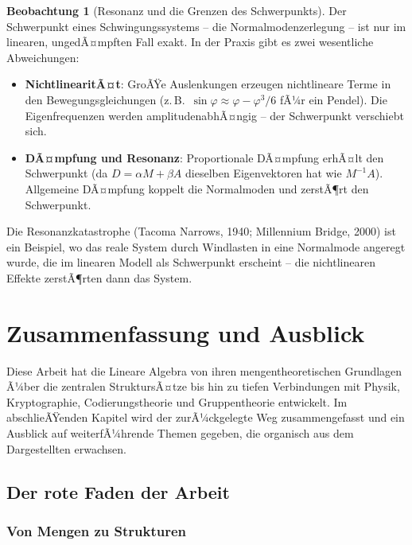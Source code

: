 ﻿\documentclass[a4paper,12pt]{report}
\theoremstyle{definition}
\newtheorem{beobachtung}{Beobachtung}
\begin{document}
\begin{beobachtung}[Resonanz und die Grenzen des Schwerpunkts]
    Der Schwerpunkt eines Schwingungssystems -- die Normalmodenzerlegung --
    ist nur im linearen, ungedÃ¤mpften Fall exakt. In der Praxis gibt es
    zwei wesentliche Abweichungen:
    \begin{itemize}
        \item[-] \textbf{NichtlinearitÃ¤t}: GroÃŸe Auslenkungen erzeugen
              nichtlineare Terme in den Bewegungsgleichungen
              (z.\,B.\ $\sin\varphi \approx \varphi - \varphi^3/6$
              fÃ¼r ein Pendel). Die Eigenfrequenzen werden
              amplitudenabhÃ¤ngig -- der Schwerpunkt verschiebt sich.
        \item[-] \textbf{DÃ¤mpfung und Resonanz}: Proportionale DÃ¤mpfung
              erhÃ¤lt den Schwerpunkt (da $D = \alpha M + \beta A$
              dieselben Eigenvektoren hat wie $M^{-1}A$). Allgemeine
              DÃ¤mpfung koppelt die Normalmoden und zerstÃ¶rt den Schwerpunkt.
    \end{itemize}
    Die Resonanzkatastrophe (Tacoma Narrows, 1940; Millennium Bridge, 2000)
    ist ein Beispiel, wo das reale System durch Windlasten in eine
    Normalmode angeregt wurde, die im linearen Modell als Schwerpunkt
    erscheint -- die nichtlinearen Effekte zerstÃ¶rten dann das System.
\end{beobachtung}

\chapter{Zusammenfassung und Ausblick}

Diese Arbeit hat die Lineare Algebra von ihren mengentheoretischen
Grundlagen Ã¼ber die zentralen StruktursÃ¤tze bis hin zu tiefen
Verbindungen mit Physik, Kryptographie, Codierungstheorie und
Gruppentheorie entwickelt. Im abschlieÃŸenden Kapitel wird der
zurÃ¼ckgelegte Weg zusammengefasst und ein Ausblick auf weiterfÃ¼hrende
Themen gegeben, die organisch aus dem Dargestellten erwachsen.

\section{Der rote Faden der Arbeit}

\subsection*{Von Mengen zu Strukturen}
\end{document}
